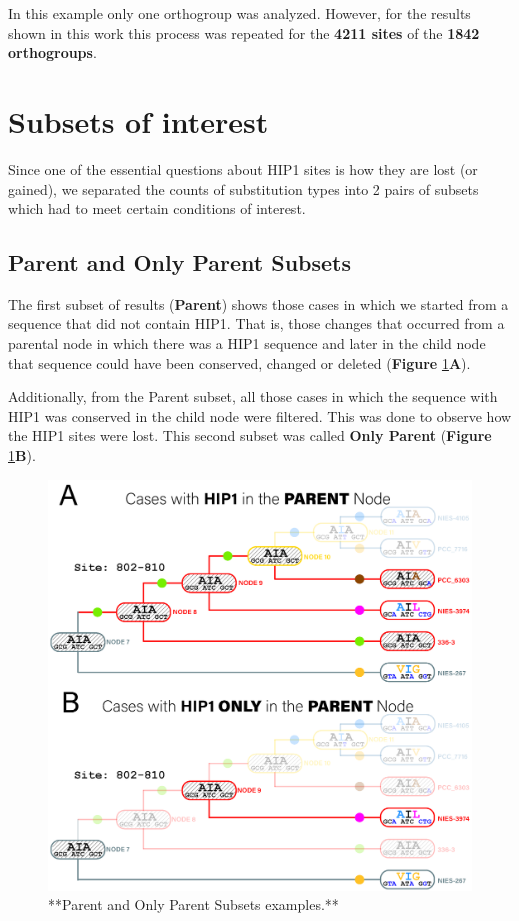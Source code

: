 \documentclass[
]{book}
\begin{document}
In this example only one orthogroup was analyzed. However, for the results shown in this work this process was repeated for the \textbf{4211 sites} of the \textbf{1842 orthogroups}.

\hypertarget{subsets-of-interest}{%
\section{Subsets of interest}\label{subsets-of-interest}}

Since one of the essential questions about HIP1 sites is how they are lost (or gained), we separated the counts of substitution types into 2 pairs of subsets which had to meet certain conditions of interest.

\hypertarget{parent-and-only-parent-subsets}{%
\subsection{Parent and Only Parent Subsets}\label{parent-and-only-parent-subsets}}

The first subset of results (\textbf{Parent}) shows those cases in which we started from a sequence that did not contain HIP1. That is, those changes that occurred from a parental node in which there was a HIP1 sequence and later in the child node that sequence could have been conserved, changed or deleted (\textbf{Figure} \ref{fig:FIG6x}\textbf{A}).

Additionally, from the Parent subset, all those cases in which the sequence with HIP1 was conserved in the child node were filtered. This was done to observe how the HIP1 sites were lost. This second subset was called \textbf{Only Parent} (\textbf{Figure} \ref{fig:FIG6x}\textbf{B}).

\begin{figure}
\includegraphics[width=1\linewidth]{figures/4x/Node_cases_A} \caption{**Parent and Only Parent Subsets examples.**}\label{fig:FIG6x}
\end{figure}
\end{document}
